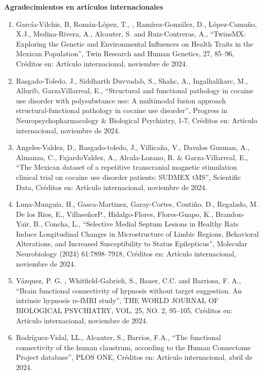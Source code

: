 \textbf{Agradecimientos en artículos internacionales}

\hfill

\begin{enumerate}

\item García-Vilchis, B, Román-López, T., , Ramírez-González, D., López-Camaño, X.J., Medina-Rivera, A., Alcauter, S. and 
Ruiz-Contreras, A., “TwinsMX: Exploring the Genetic and Environmental Influences on Health Traits in the Mexican 
Population”, Twin Research and Human Genetics, 27, 85–96, Créditos en: Artículo internacional, noviembre de 2024.

\item Rasgado-Toledo, J., Siddharth Duvvadab, S., Shahc, A., Ingalhalikarc, M., Allurib, GarzaVillarreal, E., “Structural 
and 
functional pathology in cocaine use disorder with polysubstance use: A multimodal fusion approach structural-functional 
pathology in cocaine use disorder”, Progress in Neuropsychopharmacology \& Biological Psychiatry, 1-7, Créditos en: 
Artículo 
internacional, noviembre de 2024.

\item Angeles-Valdez, D., Rasgado-toledo, J., Villicaña, V., Davalos Guzman, A., Almanza, C., FajardoValdez, A., 
Alcala-Lozano, R. \& Garza-Villarreal, E., “The Mexican dataset of a repetitive transcranial magnetic stimulation clinical 
trial on cocaine use disorder patients: SUDMEX tMS”, Scientific Data, Créditos en: Artículo internacional, noviembre de 
2024.

\item Luna-Munguia, H., Gasca-Martinez, Garay-Cortes, Coutiño, D., Regalado, M. De los Rios, E., VillaseñorP., 
Hidalgo-Flores, 
Flores-Guapo, K., Brandon-Yair, B., Concha, L., “Selective Medial Septum Lesions in Healthy Rats Induce Longitudinal 
Changes in Microstructure of Limbic Regions, Behavioral Alterations, and Increased Susceptibility to Status Epilepticus”, 
Molecular Neurobiology (2024) 61:7898–7918, Créditos en: Artículo internacional, noviembre de 2024.

\item Vázquez, P. G. , Whitfield-Gabrieli, S., Bauer, C.C. and Barriosa, F. A., “Brain functional connectivity of hypnosis 
without target suggestion. An intrinsic hypnosis rs-fMRI study”, THE WORLD JOURNAL OF BIOLOGICAL PSYCHIATRY, VOL. 25, NO. 
2, 95–105, Créditos en: Artículo internacional, noviembre de 2024.

\item Rodríguez-Vidal, LL., Alcauter, S., Barrios, F.A., “The functional connectivity of the human claustrum, according to 
the 
Human Connectome Project database”, PLOS ONE, Créditos en: Artículo internacional, abril de 2024.


\end{enumerate}
